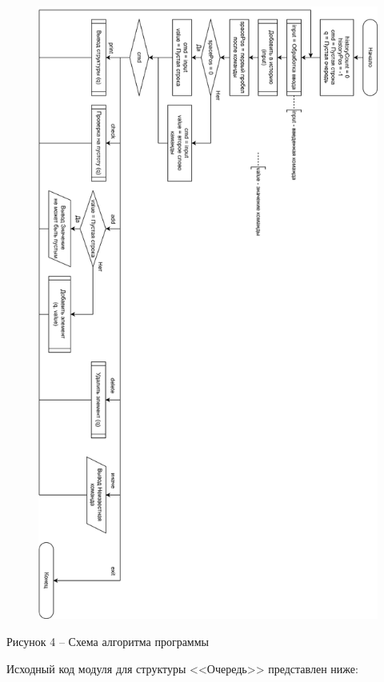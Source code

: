 \documentclass[a4paper,14pt]{extarticle}
\begin{document}
  \begin{figure}[h]
    \centering
    \includegraphics[width=0.65\linewidth]{images/s-4}
  \end{figure}
  \begin{center}
    Рисунок 4 – Схема алгоритма программы
  \end{center}

  \pagebreak

  Исходный код модуля для структуры <<Очередь>> представлен ниже:
\end{document}
